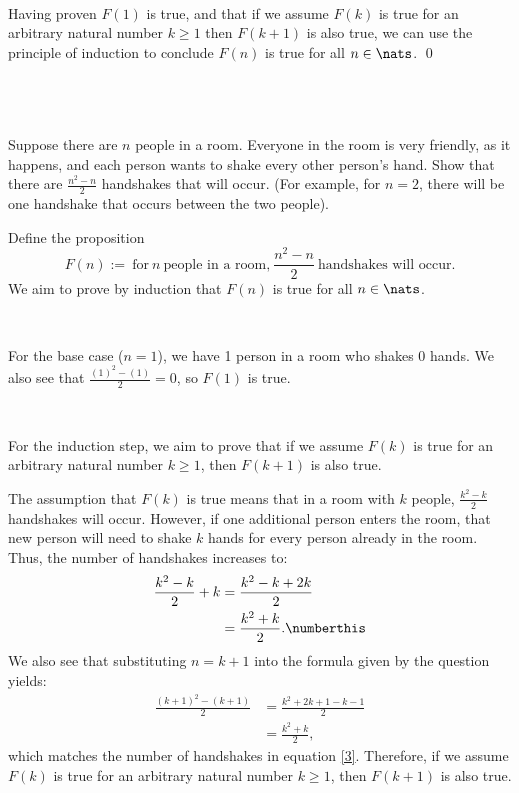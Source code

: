 \documentclass{article}
\begin{document}
\

Having proven $F(1)$ is true, and that if we assume $F(k)$ is true for an arbitrary natural number $k \geq 1$ then $F(k+1)$ is also true, we can use the principle of induction to conclude $F(n)$ is true for all $n \in \nats$. \qed

\
\hline
\section{}

\begin{problem*}
    Suppose there are $n$ people in a room. Everyone in the room is very friendly, as it happens, and each person wants to shake every other person's hand. Show that there are $\frac{n^2-n}{2}$ handshakes that will occur. (For example, for $n=2$, there will be one handshake that occurs between the two people). 
\end{problem*}

Define the proposition 
\begin{equation*}
F( n) :=\ \text{for} \ n\ \text{people in a room,} \ \frac{n^{2} -n}{2} \ \text{handshakes will occur} .
\end{equation*}
We aim to prove by induction that $F(n)$ is true for all $n \in \nats$.

\

For the base case ($n=1$), we have 1 person in a room who shakes 0 hands. We also see that $\frac{( 1)^{2} -( 1)}{2} =0$, so $F( 1)$ is true.

\

For the induction step, we aim to prove that if we assume $F( k)$ is true for an arbitrary natural number $k\geq 1$, then $F( k+1)$ is also true.

The assumption that $F(k)$ is true means that in a room with $k$ people, $\frac{k^{2} -k}{2}$ handshakes will occur. However, if one additional person enters the room, that new person will need to shake $k$ hands for every person already in the room. Thus, the number of handshakes increases to:
\begin{align*}
\frac{k^{2} -k}{2} +k & =\frac{k^{2} -k+2k}{2}\\
 & =\frac{k^{2} +k}{2} . \numberthis
\end{align*}
We also see that substituting $n=k+1$ into the formula given by the question yields:
\begin{align*}
\frac{( k+1)^{2} -( k+1)}{2} & =\frac{k^{2} +2k+1-k-1}{2}\\
 & =\frac{k^{2} +k}{2} ,
\end{align*}
which matches the number of handshakes in equation \eqref{3}. Therefore, if we assume $F( k)$ is true for an arbitrary natural number $k\geq 1$, then $F( k+1)$ is also true.
\end{document}
